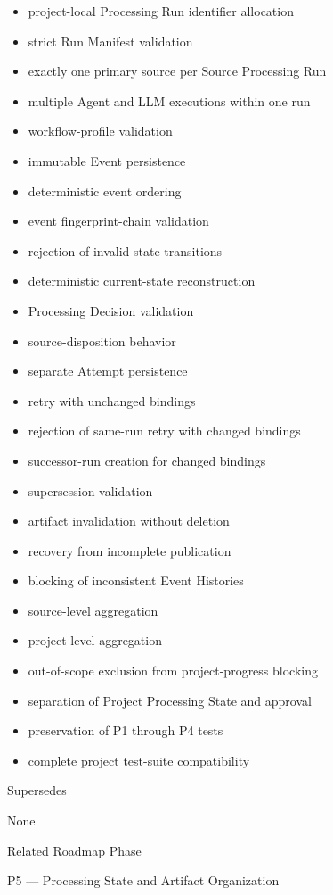 \begin{itemize}
\tightlist
\item
  project-local Processing Run identifier allocation
\item
  strict Run Manifest validation
\item
  exactly one primary source per Source Processing Run
\item
  multiple Agent and LLM executions within one run
\item
  workflow-profile validation
\item
  immutable Event persistence
\item
  deterministic event ordering
\item
  event fingerprint-chain validation
\item
  rejection of invalid state transitions
\item
  deterministic current-state reconstruction
\item
  Processing Decision validation
\item
  source-disposition behavior
\item
  separate Attempt persistence
\item
  retry with unchanged bindings
\item
  rejection of same-run retry with changed bindings
\item
  successor-run creation for changed bindings
\item
  supersession validation
\item
  artifact invalidation without deletion
\item
  recovery from incomplete publication
\item
  blocking of inconsistent Event Histories
\item
  source-level aggregation
\item
  project-level aggregation
\item
  out-of-scope exclusion from project-progress blocking
\item
  separation of Project Processing State and approval
\item
  preservation of P1 through P4 tests
\item
  complete project test-suite compatibility
\end{itemize}

Supersedes

None

Related Roadmap Phase

P5 --- Processing State and Artifact Organization

